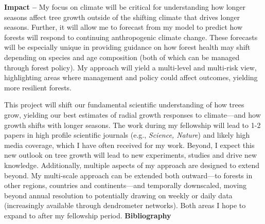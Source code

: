 \documentclass[11pt,letter,oneside]{article}
\begin{document}
{\bf Impact --}   %
My focus on climate will be critical for understanding how longer seasons affect tree growth outside of the shifting climate that drives longer seasons. Further, it will allow me to forecast from my model to predict how forests will respond to continuing anthropogenic climate change. These forecasts will be especially unique in providing guidance on how forest health may shift depending on species and age composition (both of which can be managed through forest policy). My approach will yield a multi-level and multi-risk view, highlighting areas where management and policy could affect outcomes, yielding more resilient forests.

This project will shift our fundamental scientific understanding of how trees grow, yielding our best estimates of radial growth responses to climate---and how growth shifts with longer seasons. The work during my fellowship will lead to 1-2 papers in high profile scientific journals (e.g., \emph{Science, Nature}) and likely high media coverage, which I have often received for my work. Beyond, I expect this new outlook on tree growth will lead to new experiments, studies and drive new knowledge. Additionally, multiple aspects of my approach are designed to extend beyond. My multi-scale approach can be extended both outward---to forests in other regions, countries and continents---and temporally downscaled, moving beyond annual resolution to potentially drawing on weekly or daily data (increasingly available through dendrometer networks). Both areas I hope to expand to after my fellowship period. 
\newpage
{}
{\bf Bibliography}
\singlespacing
\begin{footnotesize}
\def\section*#1{}

\end{footnotesize}
\end{document}
